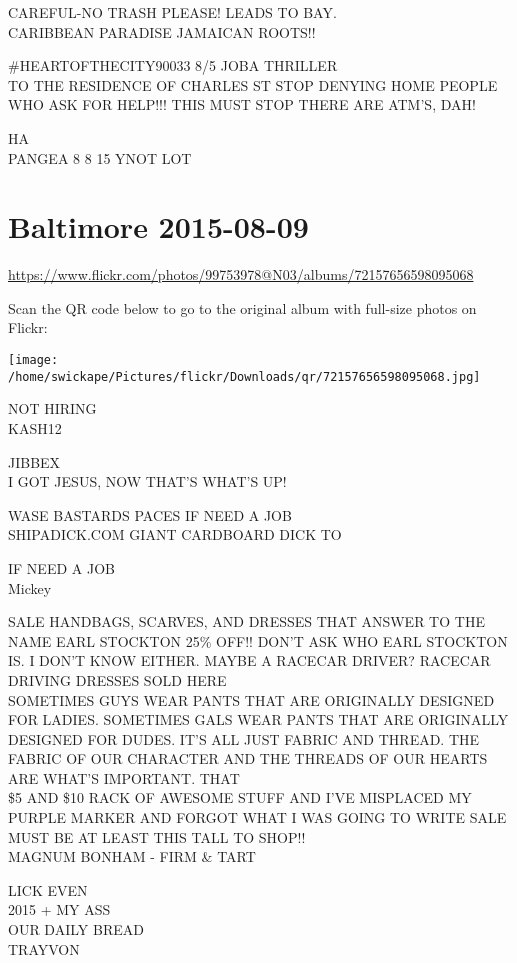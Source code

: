 \documentclass[10pt,letterpaper]{article}
\begin{document}
CAREFUL{-}NO TRASH PLEASE! LEADS TO BAY.\\
CARIBBEAN PARADISE JAMAICAN ROOTS!!

\#HEARTOFTHECITY90033 8/5 JOBA THRILLER\\
TO THE RESIDENCE OF CHARLES ST STOP DENYING HOME PEOPLE WHO ASK FOR HELP!!!  THIS MUST STOP THERE ARE ATM'S, DAH!

HA\\
PANGEA 8 8 15 YNOT LOT


\section*{Baltimore 2015-08-09}

\url{https://www.flickr.com/photos/99753978@N03/albums/72157656598095068}

Scan the QR code below to go to the original album with full-size photos on Flickr:

\texttt{[image: /home/swickape/Pictures/flickr/Downloads/qr/72157656598095068.jpg]}


NOT HIRING\\
KASH12

JIBBEX\\
I GOT JESUS, NOW THAT'S WHAT'S UP!

WASE BASTARDS PACES IF NEED A JOB\\
SHIPADICK.COM GIANT CARDBOARD DICK TO

IF NEED A JOB\\
Mickey

SALE HANDBAGS, SCARVES, AND DRESSES THAT ANSWER TO THE NAME EARL STOCKTON 25\% OFF!!  DON'T ASK WHO EARL STOCKTON IS.  I DON'T KNOW EITHER.  MAYBE A RACECAR DRIVER?  RACECAR DRIVING DRESSES SOLD HERE\\
SOMETIMES GUYS WEAR PANTS THAT ARE ORIGINALLY DESIGNED FOR LADIES.  SOMETIMES GALS WEAR PANTS THAT ARE ORIGINALLY DESIGNED FOR DUDES.  IT'S ALL JUST FABRIC AND THREAD.  THE FABRIC OF OUR CHARACTER AND THE THREADS OF OUR HEARTS ARE WHAT'S IMPORTANT.  THAT\\
\$5 AND \$10 RACK OF AWESOME STUFF AND I'VE MISPLACED MY PURPLE MARKER AND FORGOT WHAT I WAS GOING TO WRITE SALE MUST BE AT LEAST THIS TALL TO SHOP!!\\
MAGNUM BONHAM {-} FIRM \& TART

LICK EVEN\\
2015 + MY ASS\\
OUR DAILY BREAD\\
TRAYVON
\end{document}
